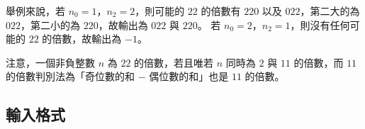 舉例來說，若
\begin{math}n_0 = 1\end{math}，\begin{math}n_2 = 2\end{math}，則可能的
\begin{math}22\end{math} 的倍數有 \begin{math}220\end{math} 以及
\begin{math}022\end{math}，第二大的為
\begin{math}022\end{math}，第二小的為
\begin{math}220\end{math}，故輸出為 \begin{math}022\end{math} 與
\begin{math}220\end{math}。 若
\begin{math}n_0 = 2\end{math}，\begin{math}n_2 = 1\end{math}，則沒有任何可能的
\begin{math}22\end{math} 的倍數，故輸出為 \begin{math}-1\end{math}。

注意，一個非負整數 \begin{math}n\end{math} 為 \begin{math}22\end{math}
的倍數，若且唯若 \begin{math}n\end{math} 同時為 \begin{math}2\end{math}
與 \begin{math}11\end{math} 的倍數，而 \begin{math}11\end{math}
的倍數判別法為「奇位數的和 \begin{math}-\end{math} 偶位數的和」也是
\begin{math}11\end{math} 的倍數。

\subsection{輸入格式}

